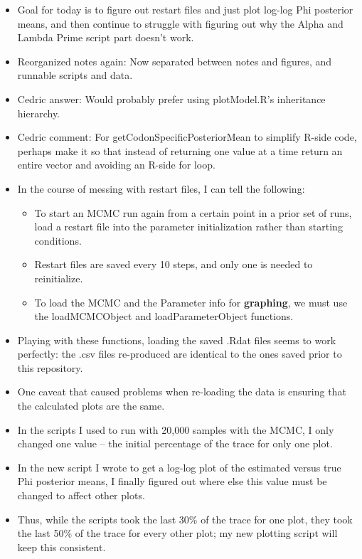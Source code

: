 \documentclass[12pt,hyperref]{labbook}
\begin{document}
\begin{itemize}
    \item Goal for today is to figure out restart files and just plot log-log Phi posterior means, and then continue to struggle with figuring out why the Alpha and Lambda Prime script part doesn't work.
    \item Reorganized notes again: Now separated between notes and figures, and runnable scripts and data.
    \item Cedric answer: Would probably prefer using plotModel.R's inheritance hierarchy.
    \item Cedric comment: For getCodonSpecificPosteriorMean to simplify R-side code, perhaps make it so that instead of returning one value at a time return an entire vector and avoiding an R-side for loop.
    \item In the course of messing with restart files, I can tell the following:
    \begin{itemize}
        \item To start an MCMC run again from a certain point in a prior set of runs, load a restart file into the parameter initialization rather than starting conditions.
        \item Restart files are saved every 10 steps, and only one is needed to reinitialize.
        \item To load the MCMC and the Parameter info for \textbf{graphing}, we must use the loadMCMCObject and loadParameterObject functions.
    \end{itemize}
    \item Playing with these functions, loading the saved .Rdat files seems to work perfectly: the .csv files re-produced are identical to the ones saved prior to this repository.
    \item One caveat that caused problems when re-loading the data is ensuring that the calculated plots are the same.
    \item In the scripts I used to run with 20,000 samples with the MCMC, I only changed one value -- the initial percentage of the trace for only one plot.
    \item In the new script I wrote to get a log-log plot of the estimated versus true Phi posterior means, I finally figured out where else this value must be changed to affect other plots.
    \item Thus, while the scripts took the last 30\% of the trace for one plot, they took the last 50\% of the trace for every other plot; my new plotting script will keep this consistent.

\end{itemize}
\end{document}
